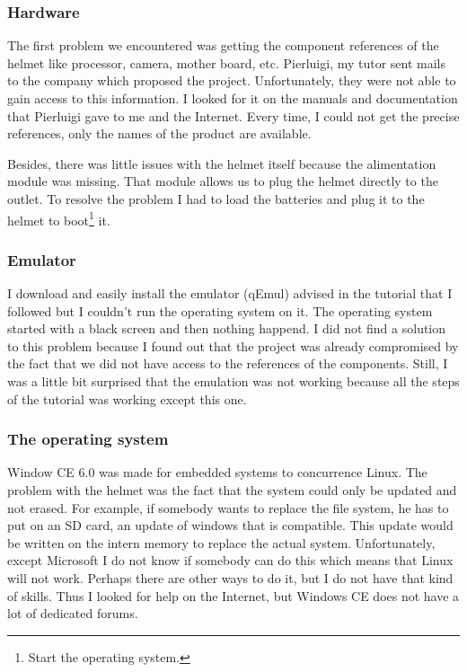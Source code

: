 	\subsubsection{Hardware}
	\par The first problem we encountered was getting the component references of the helmet like processor, camera, mother board, etc. Pierluigi, my tutor sent mails to the company which proposed the project. Unfortunately, they were not able to gain access to this information. I looked for it on the manuals and documentation that Pierluigi gave to me and the Internet. Every time, I could not get the precise references, only the names of the product are available.

	\par Besides, there was little issues with the helmet itself because the alimentation module was missing. That module allows us to plug the helmet directly to the outlet. To resolve the problem I had to load the batteries and plug it to the helmet to boot\footnote{Start the operating system.} it.

	\subsubsection{Emulator}
	
	\par I download and easily install the emulator (qEmul) advised in the tutorial that I followed but I couldn't run the operating system on it. The operating system started with a black screen and then nothing happend. I did not find a solution to this problem because I found out that the project was already compromised by the fact that we did not have access to the references of the components. Still, I was a little bit surprised that the emulation was not working because all the steps of the tutorial was working except this one.
	
	\subsubsection{The operating system}
	
	\par Window CE 6.0 was made for embedded systems to concurrence Linux. The problem with the helmet was the fact that the system could only be updated and not erased. For example, if somebody wants to replace the file system, he has to put on an SD card, an update of windows that is compatible. This update would be written on the intern memory to replace the actual system. Unfortunately, except Microsoft I do not know if somebody can do this which means that Linux will not work. Perhaps there are other ways to do it, but I do not have that kind of skills. Thus I looked for help on the Internet, but Windows CE does not have a lot of dedicated forums.
	
